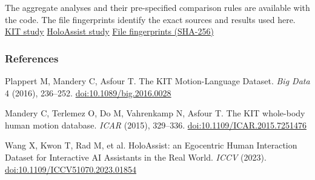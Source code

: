 \noindent The aggregate analyses and their pre-specified comparison rules are available with the code. The file fingerprints identify the exact sources and results used here. \href{https://github.com/eliminatenoise/NeuroTranslation/tree/44cb15a4d8b8b92c24551e555f59f16f4463059f/benchmarks/text-motion-retrieval}{KIT study} \textperiodcentered{} \href{https://github.com/eliminatenoise/NeuroTranslation/tree/fde458e21b4885e4bddd7614ed2c326374c87253/benchmarks/hand-language-retrieval}{HoloAssist study} \textperiodcentered{} \href{evidence.json}{File fingerprints (SHA-256)}\par

\subsubsection*{References}

\noindent [1] Plappert M, Mandery C, Asfour T. The KIT Motion-Language Dataset. \emph{Big Data} 4 (2016), 236--252. \href{https://doi.org/10.1089/big.2016.0028}{doi:10.1089/big.2016.0028}\par

\noindent [2] Mandery C, Terlemez O, Do M, Vahrenkamp N, Asfour T. The KIT whole-body human motion database. \emph{ICAR} (2015), 329--336. \href{https://doi.org/10.1109/ICAR.2015.7251476}{doi:10.1109/ICAR.2015.7251476}\par

\noindent [3] Wang X, Kwon T, Rad M, et al. HoloAssist: an Egocentric Human Interaction Dataset for Interactive AI Assistants in the Real World. \emph{ICCV} (2023). \href{https://doi.org/10.1109/ICCV51070.2023.01854}{doi:10.1109/ICCV51070.2023.01854}\par

\endgroup

